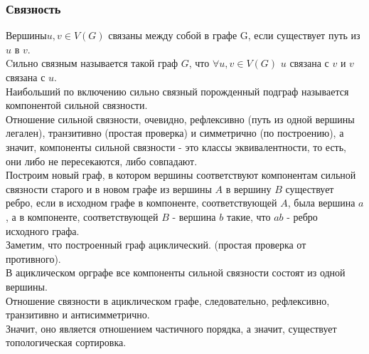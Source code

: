 \subsubsection{Связность}
$Вершины u, v \in V(G)$ связаны между собой в графе G, если существует путь из $u$ в $v$.\\
Cильно связным называется такой граф $G$, что $\forall u, v \in V(G)$ $u$ связана с $v$ и $v$ связана с $u$.\\
Наибольший по включению сильно связный порожденный подграф называется компонентой сильной связности.\\
Отношение сильной связности, очевидно, рефлексивно (путь из одной вершины легален), транзитивно (простая проверка) и симметрично (по построению), а значит, компоненты сильной связности - это классы эквивалентности, то есть, они либо не пересекаются, либо совпадают.\\
Построим новый граф, в котором вершины соответствуют компонентам сильной связности старого и в новом графе из вершины $A$ в вершину $B$ существует ребро, если в исходном графе в компоненте, соответствующей $A$, была вершина $a$, а в компоненте, соответствующей $B$ - вершина $b$ такие, что $ab$ - ребро исходного графа.\\
Заметим, что построенный граф ациклический. (простая проверка от противного).\\
В ациклическом орграфе все компоненты сильной связности состоят из одной вершины.\\
Отношение связности в ациклическом графе, следовательно, рефлексивно, транзитивно и антисимметрично.\\
Значит, оно является отношением частичного порядка, а значит, существует топологическая сортировка.
